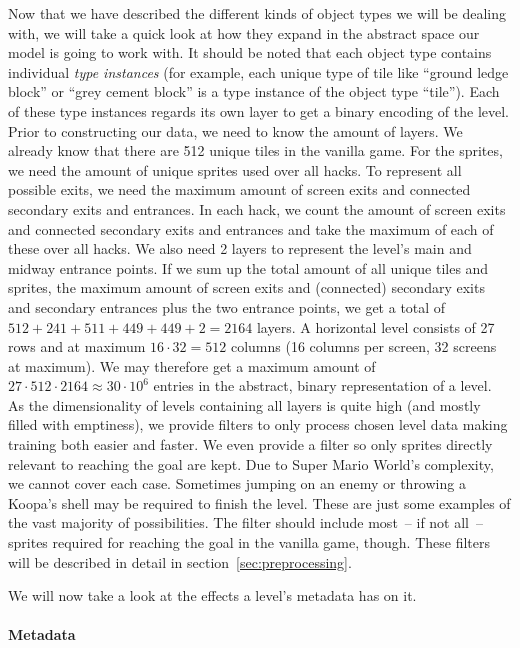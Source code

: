 Now that we have described the different kinds of object types we will
be dealing with, we will take a quick look at how they expand in the
abstract space our model is going to work with. It should be noted
that each object type contains individual \emph{type instances} (for
example, each unique type of tile like ``ground ledge block'' or
``grey cement block'' is a type instance of the object type ``tile'').
Each of these type instances regards its own layer to get a binary
encoding of the level. Prior to constructing our data, we need to know
the amount of layers. We already know that there are 512 unique tiles
in the vanilla game. For the sprites, we need the amount of unique
sprites used over all hacks. To represent all possible exits, we need
the maximum amount of screen exits and connected secondary exits and
entrances. In each hack, we count the amount of screen exits and
connected secondary exits and entrances and take the maximum of each
of these over all hacks. We also need 2 layers to represent the
level's main and midway entrance points. If we sum up the total amount
of all unique tiles and sprites, the maximum amount of screen exits
and (connected) secondary exits and secondary entrances plus the two
entrance points, we get a total of
$512 + 241 + 511 + 449 + 449 + 2 = 2164$ layers. A horizontal level
consists of 27 rows and at maximum $16 \cdot 32 = 512$ columns (16
columns per screen, 32 screens at maximum). We may therefore get a
maximum amount of $27 \cdot 512 \cdot 2164 \approx 30 \cdot 10^{6}$
entries in the
abstract, binary representation of a level. \\
As the dimensionality of levels containing all layers is quite high
(and mostly filled with emptiness), we provide filters to only process
chosen level data making training both easier and faster. We even
provide a filter so only sprites directly relevant to reaching the
goal are kept. Due to Super Mario World's complexity, we cannot cover
each case. Sometimes jumping on an enemy or throwing a Koopa's shell
may be required to finish the level. These are just some examples of
the vast majority of possibilities. The filter should include most~--
if not all~-- sprites required for reaching the goal in the vanilla
game, though. These filters will be described in detail in
section~\ref{sec:preprocessing}.

We will now take a look at the effects a level's metadata has on it.

\paragraph{Metadata}
\label{par:metadata}

